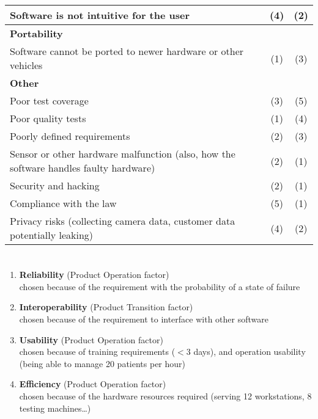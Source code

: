 \documentclass[letterpaper]{article}
\begin{document}
\begin{table}[H]
\begin{tabularx}{\textwidth}{X|c|c|}
		Software is not intuitive for the user                                                & (4)            & (2)           \\ \hline
		\textbf{Portability}                                                                  &                &               \\ \hline
		Software cannot be ported to newer hardware or other vehicles                         & (1)            & (3)           \\ \hline
		\textbf{Other}                                                                        &                &               \\ \hline
		Poor test coverage                                                                    & (3)            & (5)           \\ \hline
		Poor quality tests                                                                    & (1)            & (4)           \\ \hline
		Poorly defined requirements                                                           & (2)            & (3)           \\ \hline
		Sensor or other hardware malfunction (also, how the software handles faulty hardware) & (2)            & (1)           \\ \hline
		Security and hacking                                                                  & (2)            & (1)           \\ \hline
		Compliance with the law                                                               & (5)            & (1)           \\ \hline
		Privacy risks (collecting camera data, customer data potentially leaking)             & (4)            & (2)           \\ \hline
	\end{tabularx}
\end{table}

\section{}

\begin{enumerate}
	\item \textbf{Reliability} (Product Operation factor) \\
	chosen because of the requirement with the probability of a state of failure
	\item \textbf{Interoperability} (Product Transition factor) \\
		chosen because of the requirement to interface with other software
	\item \textbf{Usability} (Product Operation factor) \\
		chosen because of training requirements ($<3$ days), and operation usability (being able to manage 20 patients per hour)
	\item \textbf{Efficiency} (Product Operation factor) \\
		chosen because of the hardware resources required (serving 12 workstations, 8 testing machines\dots)
\end{enumerate}
\end{document}
